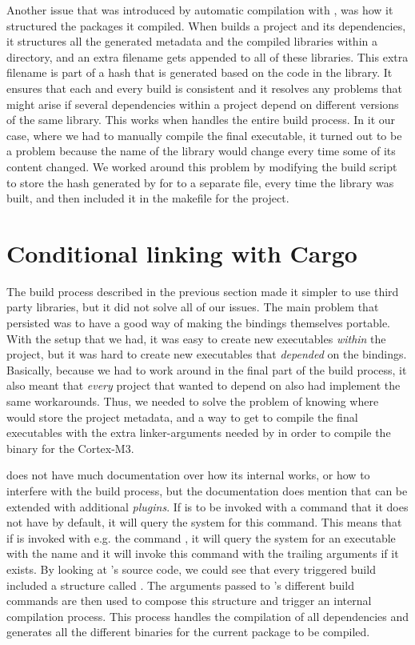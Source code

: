 Another issue that was introduced by automatic compilation with {\cargo}, was how it structured the packages it compiled.
When {\cargo} builds a project and its dependencies, it structures all the generated metadata and the compiled libraries within a  directory, and an extra filename gets appended to all of these libraries.
This extra filename is part of a hash that is generated based on the code in the library.
It ensures that each and every build is consistent and it resolves any problems that might arise if several dependencies within a project depend on different versions of the same library.
This works when {\cargo} handles the entire build process.
In it our case, where we had to manually compile the final executable, it turned out to be a problem because the name of the library would change every time some of its content changed.
We worked around this problem by modifying the build script to store the hash generated by {\cargo} for {\emlib} to a separate file, every time the library was built, and then included it in the makefile for the project.

\section{Conditional linking with Cargo}

The build process described in the previous section made it simpler to use third party libraries, but it did not solve all of our issues.
The main problem that persisted was to have a good way of making the bindings themselves portable.
With the setup that we had, it was easy to create new executables \emph{within} the project, but it was hard to create new executables that \emph{depended} on the bindings.
Basically, because we had to work around {\cargo} in the final part of the build process, it also meant that \emph{every} project that wanted to depend on {\emlib} also had implement the same workarounds.
Thus, we needed to solve the problem of knowing where {\cargo} would store the project metadata, and a way to get {\cargo} to compile the final executables with the extra linker-arguments needed by {\rustc} in order to compile the binary for the Cortex-M3.

{\cargo} does not have much documentation over how its internal works, or how to interfere with the build process, but the documentation does mention that {\cargo} can be extended with additional \emph{plugins}.
If {\cargo} is to be invoked with a command that it does not have by default, it will query the system for this command.
This means that if {\cargo} is invoked with e.g. the command , it will query the system for an executable with the name  and it will invoke this command with the trailing arguments if it exists.
By looking at {\cargo}'s source code, we could see that every triggered build included a structure called .
The arguments passed to {\cargo}'s different build commands are then used to compose this structure and trigger an internal compilation process.
This process handles the compilation of all dependencies and generates all the different binaries for the current package to be compiled.

